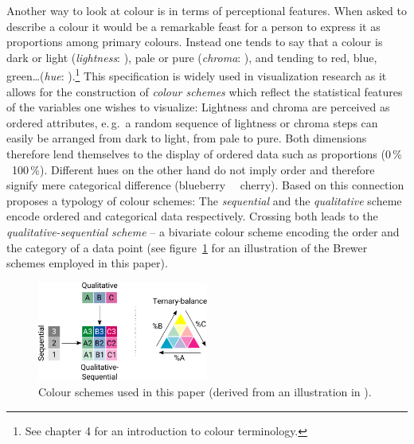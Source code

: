 \documentclass[parskip=half]{scrartcl}
\begin{document}
Another way to look at colour is in terms of perceptional features. When asked to describe a colour it would be a remarkable feast for a person to express it as proportions among primary colours. Instead one tends to say that a colour is dark or light (\emph{lightness}:   ), pale or pure (\emph{chroma}:   ), and tending to red, blue, green\ldots (\emph{hue}:   ).\footnote{
  See \cite{Fairchild2005} chapter 4 for an introduction to colour terminology.
}
This specification is widely used in visualization research as it allows for the construction of \emph{colour schemes} which reflect the statistical features of the variables one wishes to visualize: Lightness and chroma are perceived as ordered attributes, e.\,g.~a random sequence of lightness or chroma steps can easily be arranged from dark to light, from pale to pure. Both dimensions therefore lend themselves to the display of ordered data such as proportions (0\,\%~  ~100\,\%). Different hues on the other hand do not imply order and therefore signify mere categorical difference (blueberry~ ~cherry). Based on this connection \textcite{Brewer1994} proposes a typology of colour schemes: The \emph{sequential} and the \emph{qualitative} scheme encode ordered and categorical data respectively. Crossing both leads to the \emph{qualitative-sequential scheme} -- a bivariate colour scheme encoding the order and the category of a data point (see figure~\ref{fig:brewer} for an illustration of the Brewer schemes employed in this paper).

\begin{figure}[!htb]
  \centering
  \includegraphics[width = 0.5\textwidth]{./fig/brewer_subset.pdf}
  \caption{Colour schemes used in this paper (derived from an illustration in \cite{Brewer1994}).}
  \label{fig:brewer}
\end{figure}

\clearpage
\end{document}
